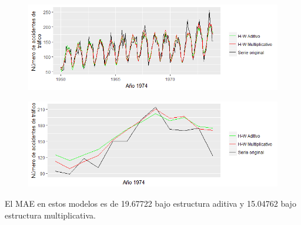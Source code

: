 \documentclass[10pt,a4paper,twoside]{beamer}
\begin{document}
\begin{frame}[fragile]

\begin{figure}
    \centering
    \centerline{\includegraphics[scale = 0.5]{Images/313.png}}
\end{figure}

\begin{figure}
    \centering
    \centerline{\includegraphics[scale = 0.5]{Images/314.png}}
\end{figure}

El MAE en estos modelos es de 19.67722 bajo estructura aditiva y 15.04762 bajo estructura multiplicativa.

\end{frame}

\end{document}
